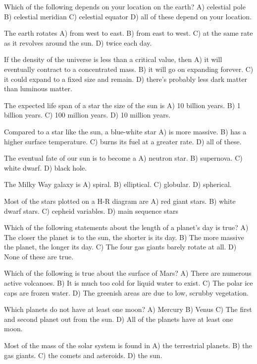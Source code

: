 Which of the following depends on your location on the earth?
    A)  celestial pole
    B)  celestial meridian
    C)  celestial equator
    D)  all of these depend on your location.

The earth rotates
    A)  from west to east.
    B)  from east to west.
    C)  at the same rate as it revolves around the sun.
    D)  twice each day.

If the density of the universe is less than a critical value, then
    A)  it will eventually contract to a concentrated mass.
    B)  it will go on expanding forever.
    C)  it could expand to a fixed size and remain.
    D)  there's probably less dark matter than luminous matter.

The expected life span of a star the size of the sun is
    A)  10 billion years.
    B)  1 billion years.
    C)  100 million years.
    D)  10 million years.

Compared to a star like the sun, a blue-white star
    A)  is more massive.
    B)  has a higher surface temperature.
    C)  burns its fuel at a greater rate.
    D)  all of these.

The eventual fate of our sun is to become a
    A)  neutron star.
    B)  supernova.
    C)  white dwarf.
    D)  black hole.

The Milky Way galaxy is
    A)  spiral.
    B)  elliptical.
    C)  globular.
    D)  spherical.

Most of the stars plotted on a H-R diagram are
A)  red giant stars.
B)  white dwarf stars.
C)  cepheid variables.
D)  main sequence stars


Which of the following statements about the length of a planet's day is true?
A)  The closer the planet is to the sun, the shorter is its day.
B)  The more massive the planet, the longer its day.
C)  The four gas giants barely rotate at all.
D)  None of these are true.

Which of the following is true about the surface of Mars?
    A)  There are numerous active volcanoes.
    B)  It is much too cold for liquid water to exist.
    C)  The polar ice caps are frozen water.
    D)  The greenish areas are due to low, scrubby vegetation.

Which planets do not have at least one moon?
    A)  Mercury
    B)  Venus
    C)  The first and second planet out from the sun.
    D)  All of the planets have at least one moon.

Most of the mass of the solar system is found in
    A)  the terrestrial planets.
    B)  the gas giants.
    C)  the comets and asteroids.
    D)  the sun.

